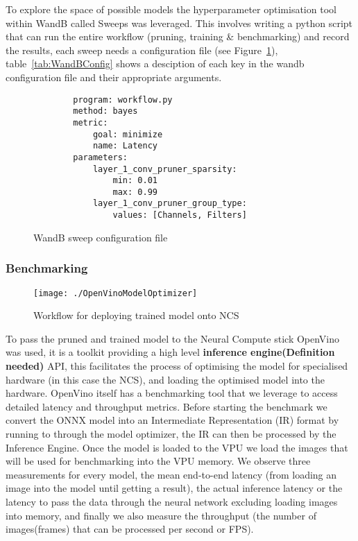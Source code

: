\documentclass[../Dissertation.tex]{subfiles}
\begin{document}
To explore the space of possible models the hyperparameter optimisation tool within WandB called Sweeps was leveraged. 
This involves writing a python script that can run the entire workflow (pruning, training \& benchmarking) and record the results, each sweep needs a configuration file (see Figure~\ref{fig:sweepConfig}), table~\ref{tab:WandBConfig} shows a desciption of each key in the wandb configuration file and their appropriate arguments. 



\singlespacing
\begin{figure}[H]
    \begin{verbatim}
        program: workflow.py
        method: bayes
        metric:
            goal: minimize
            name: Latency
        parameters:
            layer_1_conv_pruner_sparsity:
                min: 0.01
                max: 0.99
            layer_1_conv_pruner_group_type:
                values: [Channels, Filters]
    \end{verbatim}
    \caption{WandB sweep configuration file}
    \label{fig:sweepConfig}
\end{figure}
\doublespacing



\subsubsection{Benchmarking}

\begin{figure}[H]
	\centering
	\texttt{[image: ./OpenVinoModelOptimizer]}
	\caption{Workflow for deploying trained model onto NCS \autocite{ModelOptimizerDeveloper}}
	\label{fig:OpenVinoWorkflow}
\end{figure}


To pass the pruned and trained model to the Neural Compute stick OpenVino was used, it is a toolkit providing a high level \textbf{inference engine(Definition needed)} API, this facilitates the process of optimising the model for specialised hardware (in this case the NCS), and loading the optimised model into the hardware. 
OpenVino itself has a benchmarking tool that we leverage to access detailed latency and throughput metrics. 
Before starting the benchmark we convert the ONNX model into an Intermediate Representation (IR) format by running to through the model optimizer, the IR can then be processed by the Inference Engine.
Once the model is loaded to the VPU we load the images that will be used for benchmarking into the VPU memory.
We observe three measurements for every model, the mean end-to-end latency (from loading an image into the model until getting a result), the actual inference latency or the latency to pass the data through the neural network excluding loading images into memory, and finally we also measure the throughput (the number of images(frames) that can be processed per second or FPS).
\end{document}
